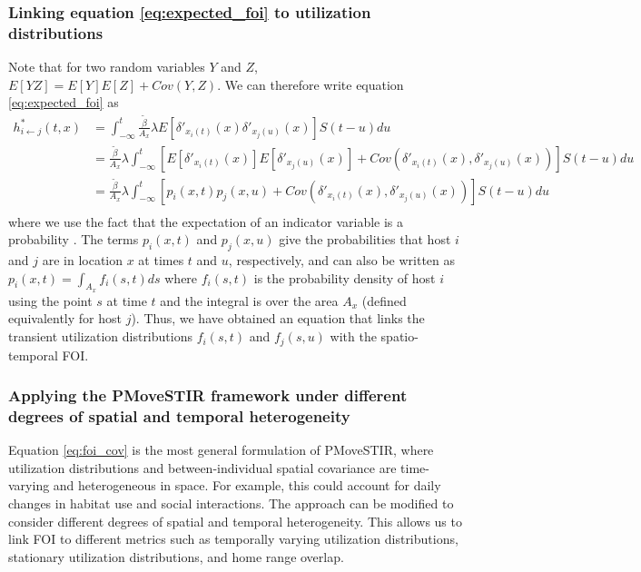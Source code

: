 \documentclass[letterpaper]{article}
\begin{document}
\subsubsection*{Linking equation \ref{eq:expected_foi} to utilization distributions}

Note that for two random variables $Y$ and $Z$, $E[YZ] = E[Y]E[Z] + Cov(Y, Z)$.  We can therefore write equation \ref{eq:expected_foi} as
\begin{equation}
    \begin{aligned}
        h^*_{i \leftarrow j}(t, x) &= \int_{-\infty}^{t} \frac{\tilde{\beta}}{A_x} \lambda E[\delta'_{x_i(t)}(x) \delta'_{x_j(u)}(x)] S(t - u) du \\
        &= \frac{\tilde{\beta}}{A_x} \lambda \int_{-\infty}^{t} [E[\delta'_{x_i(t)}(x)] E[\delta'_{x_j(u)}(x)] + Cov(\delta'_{x_i(t)}(x), \delta'_{x_j(u)}(x))] S(t - u) du \\
        &= \frac{\tilde{\beta}}{A_x} \lambda \int_{-\infty}^{t} [p_i(x, t) p_j(x, u) + Cov(\delta'_{x_i(t)}(x), \delta'_{x_j(u)}(x))] S(t - u) du \\
    \end{aligned}
    \label{eq:foi_cov}
\end{equation}
where we use the fact that the expectation of an indicator variable is a probability \citep{Grimmett2001}. The terms $p_i(x, t)$ and $p_j(x,u)$ give the probabilities that host $i$ and $j$ are in location $x$ at times $t$ and $u$, respectively, and can also be written as $p_i(x, t) = \int_{A_x} f_i(s, t) ds$ where $f_i(s, t)$ is the probability density of host $i$ using the point $s$ at time $t$ and the integral is over the area $A_x$ (defined equivalently for host $j$). Thus, we have obtained an equation that links the transient utilization distributions $f_i(s, t)$ and $f_j(s, u)$ with the spatio-temporal FOI.

\subsubsection*{Applying the PMoveSTIR framework under different degrees of spatial and temporal heterogeneity}

Equation \ref{eq:foi_cov} is the most general formulation of PMoveSTIR, where utilization distributions and between-individual spatial covariance are time-varying and heterogeneous in space. For example, this could account for daily changes in habitat use and social interactions. The approach can be modified to consider different degrees of spatial and temporal heterogeneity. This allows us to link FOI to different metrics such as temporally varying utilization distributions, stationary utilization distributions, and home range overlap. 
\end{document}
